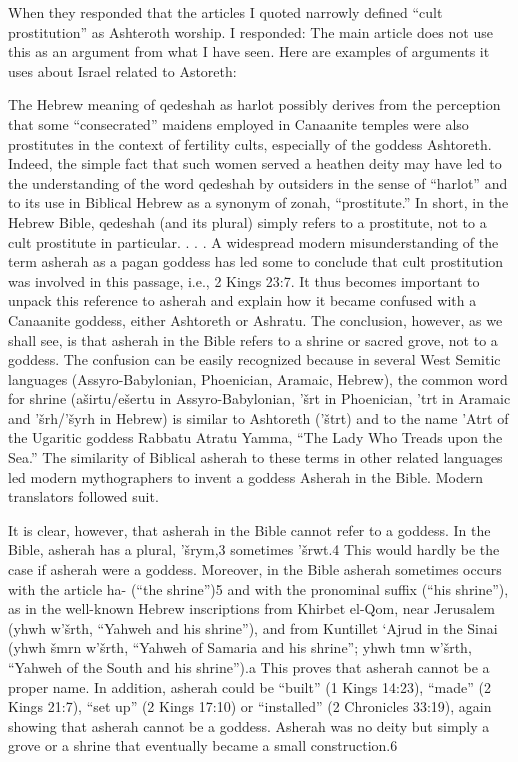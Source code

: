 \documentclass[11pt]{article}
\begin{document}
{When they responded that the articles I quoted narrowly defined “cult prostitution” as Ashteroth worship. I responded: The main article does not use this as an argument from what I have seen. Here are examples of arguments it uses about Israel related to Astoreth:

The Hebrew meaning of qedeshah as harlot possibly derives from the perception that some “consecrated” maidens employed in Canaanite temples were also prostitutes in the context of fertility cults, especially of the goddess Ashtoreth. Indeed, the simple fact that such women served a heathen deity may have led to the understanding of the word qedeshah by outsiders in the sense of “harlot” and to its use in Biblical Hebrew as a synonym of zonah, “prostitute.” In short, in the Hebrew Bible, qedeshah (and its plural) simply refers to a prostitute, not to a cult prostitute in particular.
. . . 
A widespread modern misunderstanding of the term asherah as a pagan goddess has led some to conclude that cult prostitution was involved in this passage, i.e., 2 Kings 23:7. It thus becomes important to unpack this reference to asherah and explain how it became confused with a Canaanite goddess, either Ashtoreth or Ashratu. The conclusion, however, as we shall see, is that asherah in the Bible refers to a shrine or sacred grove, not to a goddess.
The confusion can be easily recognized because in several West Semitic languages (Assyro-Babylonian, Phoenician, Aramaic, Hebrew), the common word for shrine (aširtu/ešertu in Assyro-Babylonian, ’šrt in Phoenician, ’trt in Aramaic and ’šrh/’šyrh in Hebrew) is similar to Ashtoreth (’štrt) and to the name ’Atrt of the Ugaritic goddess Rabbatu Atratu Yamma, “The Lady Who Treads upon the Sea.” The similarity of Biblical asherah to these terms in other related languages led modern mythographers to invent a goddess Asherah in the Bible. Modern translators followed suit.

It is clear, however, that asherah in the Bible cannot refer to a goddess. In the Bible, asherah has a plural, ’šrym,3 sometimes ’šrwt.4 This would hardly be the case if asherah were a goddess. Moreover, in the Bible asherah sometimes occurs with the article ha- (“the shrine”)5 and with the pronominal suffix (“his shrine”), as in the well-known Hebrew inscriptions from Khirbet el-Qom, near Jerusalem (yhwh w’šrth, “Yahweh and his shrine”), and from Kuntillet ‘Ajrud in the Sinai (yhwh šmrn w’šrth, “Yahweh of Samaria and his shrine”; yhwh tmn w’šrth, “Yahweh of the South and his shrine”).a This proves that asherah cannot be a proper name. In addition, asherah could be “built” (1 Kings 14:23), “made” (2 Kings 21:7), “set up” (2 Kings 17:10) or “installed” (2 Chronicles 33:19), again showing that asherah cannot be a goddess. Asherah was no deity but simply a grove or a shrine that eventually became a small construction.6

}
\end{document}
